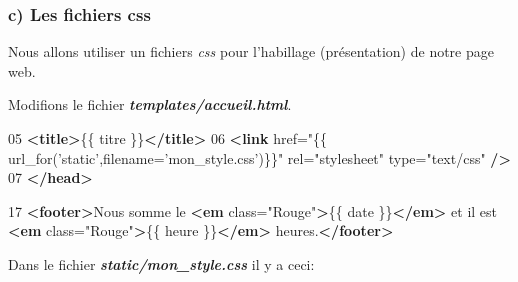 \documentclass{article}
\newenvironment{Shaded}{}{}
\newcommand{\KeywordTok}[1]{\textcolor[rgb]{0.00,0.44,0.13}{\textbf{{#1}}}}
\newcommand{\StringTok}[1]{\textcolor[rgb]{0.25,0.44,0.63}{{#1}}}
\newcommand{\OtherTok}[1]{\textcolor[rgb]{0.00,0.44,0.13}{{#1}}}
\newcommand{\NormalTok}[1]{{#1}}
\begin{document}
    \subsubsection{c) Les fichiers css}\label{c-les-fichiers-css}

Nous allons utiliser un fichiers \emph{css} pour l'habillage
(présentation) de notre page web.

Modifions le fichier \textbf{\emph{templates/accueil.html}}.

\begin{Shaded}
\begin{Highlighting}[]
\NormalTok{05 }\KeywordTok{<title>}\NormalTok{\{\{ titre \}\}}\KeywordTok{</title>}
\NormalTok{06 }\KeywordTok{<link}\OtherTok{ href=}\StringTok{"\{\{ url_for('static',filename='mon_style.css')\}\}"}\OtherTok{ rel=}\StringTok{"stylesheet"}\OtherTok{ type=}\StringTok{"text/css"} \KeywordTok{/>}
\NormalTok{07 }\KeywordTok{</head>}
\end{Highlighting}
\end{Shaded}

\begin{Shaded}
\begin{Highlighting}[]
\NormalTok{17    }\KeywordTok{<footer>}\NormalTok{Nous somme le }\KeywordTok{<em}\OtherTok{ class=}\StringTok{"Rouge"}\KeywordTok{>}\NormalTok{\{\{ date \}\}}\KeywordTok{</em>} \NormalTok{et il est }\KeywordTok{<em}\OtherTok{ class=}\StringTok{"Rouge"}\KeywordTok{>}\NormalTok{\{\{ heure \}\}}\KeywordTok{</em>} \NormalTok{heures.}\KeywordTok{</footer>}
\end{Highlighting}
\end{Shaded}

Dans le fichier \textbf{\emph{static/mon\_style.css}} il y a ceci:
\end{document}

